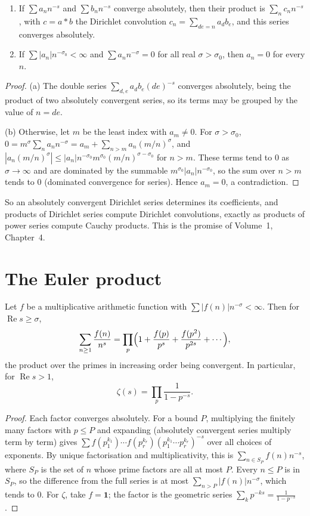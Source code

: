 \begin{proposition}\label{prop:dirmult}
\begin{enumerate}[label=(\alph*)]
\item If $\sum a_nn^{-s}$ and $\sum b_nn^{-s}$ converge absolutely, then their product is $\sum_nc_nn^{-s}$, with $c=a*b$ the Dirichlet convolution
$c_n=\sum_{de=n}a_db_e$, and this series converges absolutely.
\item If $\sum|a_n|n^{-\sigma_0}<\infty$ and $\sum a_nn^{-\sigma}=0$ for all real $\sigma>\sigma_0$, then $a_n=0$ for every $n$.
\end{enumerate}
\end{proposition}
\begin{proof}
(a) The double series $\sum_{d,e}a_db_e(de)^{-s}$ converges absolutely, being the product of two absolutely convergent series, so its terms
may be grouped by the value of $n=de$.

(b) Otherwise, let $m$ be the least index with $a_m\ne0$. For $\sigma>\sigma_0$, $0=m^\sigma\sum_na_nn^{-\sigma}=a_m+\sum_{n>m}a_n(m/n)^\sigma$, and
$|a_n(m/n)^\sigma|\le|a_n|n^{-\sigma_0}m^{\sigma_0}(m/n)^{\sigma-\sigma_0}$ for $n>m$. These terms tend to $0$ as $\sigma\to\infty$ and are dominated by the summable
$m^{\sigma_0}|a_n|n^{-\sigma_0}$, so the sum over $n>m$ tends to $0$ (dominated convergence for series). Hence $a_m=0$, a contradiction.
\end{proof}

So an absolutely convergent Dirichlet series determines its coefficients, and products of Dirichlet series compute Dirichlet
convolutions, exactly as products of power series compute Cauchy products. This is the promise of Volume~1, Chapter~4.

\section{The Euler product}

\begin{theorem}\label{thm:eulerproduct}
Let $f$ be a multiplicative arithmetic function with $\sum|f(n)|n^{-\sigma}<\infty$. Then for $\operatorname{Re}s\ge\sigma$,
\[
\sum_{n\ge1}\frac{f(n)}{n^s}=\prod_p\Bigl(1+\frac{f(p)}{p^s}+\frac{f(p^2)}{p^{2s}}+\cdots\Bigr),
\]
the product over the primes in increasing order being convergent. In particular, for $\operatorname{Re}s>1$,
\[
\zeta(s)=\prod_p\frac1{1-p^{-s}}.
\]
\end{theorem}
\begin{proof}
Each factor converges absolutely. For a bound $P$, multiplying the finitely many factors with $p\le P$ and expanding (absolutely
convergent series multiply term by term) gives $\sum f(p_1^{k_1})\cdots f(p_r^{k_r})(p_1^{k_1}\cdots p_r^{k_r})^{-s}$ over all choices of exponents. By unique
factorisation and multiplicativity, this is $\sum_{n\in S_P}f(n)n^{-s}$, where $S_P$ is the set of $n$ whose prime factors are all at most $P$. Every
$n\le P$ is in $S_P$, so the difference from the full series is at most $\sum_{n>P}|f(n)|n^{-\sigma}$, which tends to $0$. For $\zeta$, take $f=\mathbf 1$; the
factor is the geometric series $\sum_kp^{-ks}=\frac1{1-p^{-s}}$.
\end{proof}

